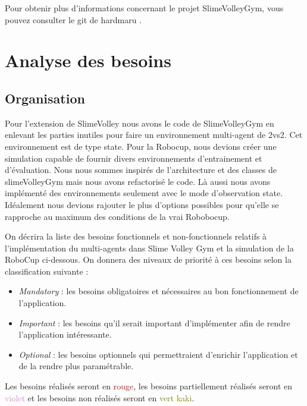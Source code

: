 \documentclass[11pt, a4paper]{article}
\begin{document}
	\vspace{0.5cm}

	Pour obtenir plus d'informations concernant le projet SlimeVolleyGym, vous pouvez consulter le git de hardmaru \cite{slimevolleygym}.

	\vspace{0.5cm}

	\section{Analyse des besoins}

	\subsection{Organisation}

	Pour l'extension de SlimeVolley nous avons le code de SlimeVolleyGym en enlevant les parties inutiles pour faire un environnement multi-agent de 2vs2. Cet environnement est de type state.
	\vspace{0.5cm}
	Pour la Robocup, nous devions créer une simulation capable de fournir divers environnements d'entrainement et d'évaluation.
	Nous nous sommes inspirés de l'architecture et des classes de slimeVolleyGym mais nous avons refactorisé le code. Là aussi nous avons implémenté des environnements seulement avec le mode d'observation state.
	Idéalement nous devions rajouter le plus d'options possibles pour qu'elle se rapproche au maximum des conditions de la vrai Robobocup.
	\vspace{1cm}

	On décrira la liste des besoins fonctionnels et non-fonctionnels relatifs à l'implémentation du multi-agents dans Slime Volley Gym et la simulation de la RoboCup ci-dessous. On donnera des niveaux de priorité à ces besoins selon la classification suivante :

	\begin{itemize}
		\item \textit{Mandatory} : les besoins obligatoires et nécessaires au bon fonctionnement de l'application.
		\item \textit{Important} : les besoins qu'il serait important d'implémenter afin de rendre l'application intéressante.
		\item \textit{Optional} : les besoins optionnels qui permettraient d'enrichir l'application et de la rendre plus paramétrable.
	\end{itemize}

	Les besoins réalisés seront en \textcolor{red}{rouge}, les besoins partiellement réalisés seront en \textcolor{violet}{violet} et les besoins non réalisés seront en \textcolor{olive}{vert kaki}.
\end{document}
